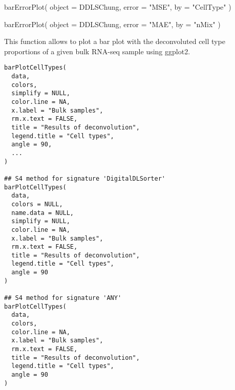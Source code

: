 \documentclass[a4paper]{book}
\begin{document}
%
\begin{SeeAlso}\relax
{} 
 
\end{SeeAlso}
%
\begin{Examples}
\begin{ExampleCode}
barErrorPlot(
  object = DDLSChung,
  error = "MSE",
  by = "CellType"
)

barErrorPlot(
  object = DDLSChung,
  error = "MAE",
  by = "nMix"
)
\end{ExampleCode}
\end{Examples}
%
\begin{Description}\relax
This function allows to plot a bar plot with the deconvoluted cell type
proportions of a given bulk RNA-seq sample using ggplot2.
\end{Description}
%
\begin{Usage}
\begin{verbatim}
barPlotCellTypes(
  data,
  colors,
  simplify = NULL,
  color.line = NA,
  x.label = "Bulk samples",
  rm.x.text = FALSE,
  title = "Results of deconvolution",
  legend.title = "Cell types",
  angle = 90,
  ...
)

## S4 method for signature 'DigitalDLSorter'
barPlotCellTypes(
  data,
  colors = NULL,
  name.data = NULL,
  simplify = NULL,
  color.line = NA,
  x.label = "Bulk samples",
  rm.x.text = FALSE,
  title = "Results of deconvolution",
  legend.title = "Cell types",
  angle = 90
)

## S4 method for signature 'ANY'
barPlotCellTypes(
  data,
  colors,
  color.line = NA,
  x.label = "Bulk samples",
  rm.x.text = FALSE,
  title = "Results of deconvolution",
  legend.title = "Cell types",
  angle = 90
)
\end{verbatim}
\end{Usage}
%
\end{document}
